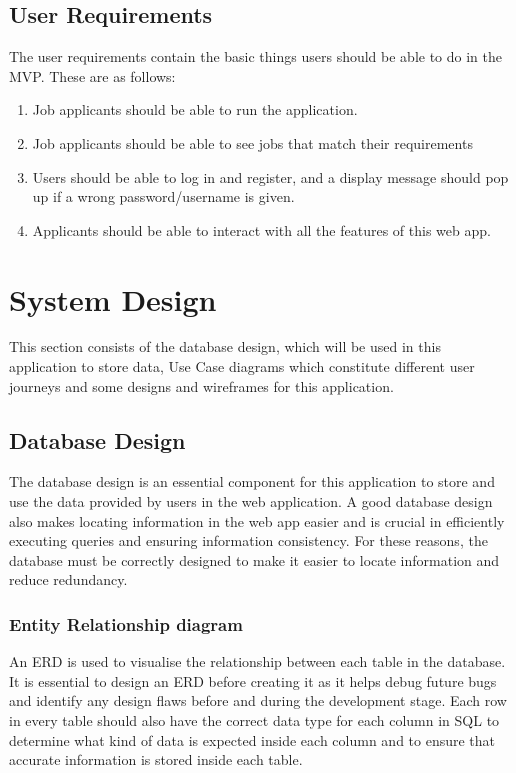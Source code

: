 \subsection{User Requirements}
The user requirements contain the basic things users should be able to do in the MVP. These are as follows:
\begin{enumerate}
    \item Job applicants should be able to run the application.
    \item Job applicants should be able to see jobs that match their requirements
    \item Users should be able to log in and register, and a display message should pop up if a wrong password/username is given.
    \item Applicants should be able to interact with all the features of this web app.
\end{enumerate}

\section{System Design}
This section consists of the database design, which will be used in this application to store data, Use Case diagrams which constitute different user journeys and some designs and wireframes for this application. 

\subsection{Database Design}
The database design is an essential component for this application to store and use the data provided by users in the web application. A good database design also makes locating information in the web app easier and is crucial in efficiently executing queries and ensuring information consistency. For these reasons, the database must be correctly designed to make it easier to locate information and reduce redundancy.

\subsubsection{Entity Relationship diagram}
An ERD is used to visualise the relationship between each table in the database. It is essential to design an ERD before creating it as it helps debug future bugs and identify any design flaws before and during the development stage. Each row in every table should also have the correct data type for each column in SQL to determine what kind of data is expected inside each column and to ensure that accurate information is stored inside each table.

